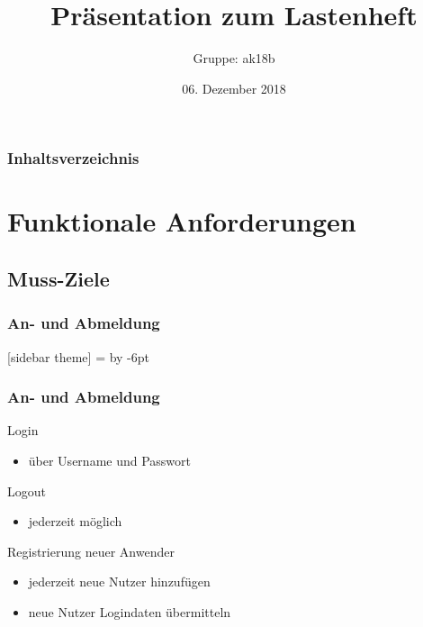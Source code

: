 \documentclass{beamer}
\title{Präsentation zum Lastenheft}
\author{Gruppe: ak18b}
\date{06. Dezember 2018}
\begin{document}

\begin{frame}
\frametitle{Inhaltsverzeichnis}
\small
\tableofcontents
\end{frame}

\section{Funktionale Anforderungen}

\subsection{Muss-Ziele}

\subsubsection{An- und Abmeldung}

[sidebar theme]
\makeatletter
  {
    \beamer@tempdim=\beamer@sidebarwidth%
    \advance\beamer@tempdim by -6pt%
    \insertverticalnavigation{\beamer@sidebarwidth}%
    \vfill
    \ifx\beamer@sidebarside\beamer@lefttext%
    \else%
      \vskip2pt%
    \fi%
  }%
\makeatother
\begin{frame}
\frametitle{An- und Abmeldung}

\begin{block}{Login}
\begin{itemize}
\item über Username und Passwort
\end{itemize}
\end{block}

\begin{block}{Logout}
\begin{itemize}
\item jederzeit möglich
\end{itemize}
\end{block}

\begin{block}{Registrierung neuer Anwender}
\begin{itemize}
\item jederzeit neue Nutzer hinzufügen
\item neue Nutzer Logindaten übermitteln
\end{itemize}
\end{block}

\end{frame}
\end{document}
